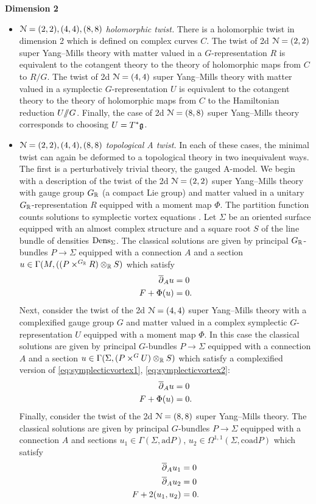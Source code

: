 \documentclass[10pt, oneside]{article}
\begin{document}
\textbf{Dimension 2}
\begin{itemize}
 \item \emph{$\mathcal{N}=(2,2), (4,4), (8,8)$ holomorphic twist.} There is a holomorphic twist in dimension 2 which is defined on complex curves $C$. The twist of 2d $\mathcal N=(2, 2)$ super Yang--Mills theory with matter valued in a $G$-representation $R$ is equivalent to the cotangent theory to the theory of holomorphic maps from $C$ to $R/G$. The twist of 2d $\mathcal N=(4, 4)$ super Yang--Mills theory with matter valued in a symplectic $G$-representation $U$ is equivalent to the cotangent theory to the theory of holomorphic maps from $C$ to the Hamiltonian reduction $U/\!\!/ G$. Finally, the case of 2d $\mathcal N=(8, 8)$ super Yang--Mills theory corresponds to choosing $U=T^*\mathfrak g$.
 \item \emph{$\mathcal{N}=(2,2), (4,4), (8,8)$ topological A twist.} In each of these cases, the minimal twist can again be deformed to a topological theory in two inequivalent ways.  The first is a perturbatively trivial theory, the gauged A-model. We begin with a description of the twist of the 2d $\mathcal N=(2, 2)$ super Yang--Mills theory with gauge group $G_\mathbb R$ (a compact Lie group) and matter valued in a unitary $G_\mathbb R$-representation $R$ equipped with a moment map $\Phi$. The partition function counts solutions to symplectic vortex equations \cite{CGMRS}. Let $\Sigma$ be an oriented surface equipped with an almost complex structure and a square root $S$ of the line bundle of densities $\mathrm{Dens}_\Sigma$. The classical solutions are given by principal $G_\mathbb R$-bundles $P\rightarrow \Sigma$ equipped with a connection $A$ and a section $u\in\Gamma(M, ((P\times^{G_\mathbb R} R)\otimes_\mathbb R S)$ which satisfy
\begin{align}
\overline{\partial}_A u &= 0 \label{eq:symplecticvortex1} \\
F + \Phi(u) &= 0. \label{eq:symplecticvortex2}
\end{align}
Next, consider the twist of the 2d $\mathcal N=(4, 4)$ super Yang--Mills theory with a complexified gauge group $G$ and matter valued in a complex symplectic $G$-representation $U$ equipped with a moment map $\Phi$. In this case the classical solutions are given by principal $G$-bundles $P\rightarrow \Sigma$ equipped with a connection $A$ and a section $u\in\Gamma(\Sigma, (P\times^G U)\otimes_\mathbb R S)$ which satisfy a complexified version of \eqref{eq:symplecticvortex1}, \eqref{eq:symplecticvortex2}:
\begin{align}
\overline{\partial}_A u &= 0 \\
F + \Phi(u) &= 0.
\end{align}
Finally, consider the twist of the 2d $\mathcal N=(8, 8)$ super Yang--Mills theory. The classical solutions are given by principal $G$-bundles $P\rightarrow \Sigma$ equipped with a connection $A$ and sections $u_1\in\Gamma(\Sigma, \mathrm{ad} P)$, $u_2\in\Omega^{1, 1}(\Sigma, \mathrm{coad} P)$ which satisfy
\begin{align}
\overline{\partial}_A u_1 &= 0 \\
\overline{\partial}_A u_2 &= 0 \\
F + 2(u_1, u_2) &= 0.
\end{align}


\end{itemize}
\end{document}
